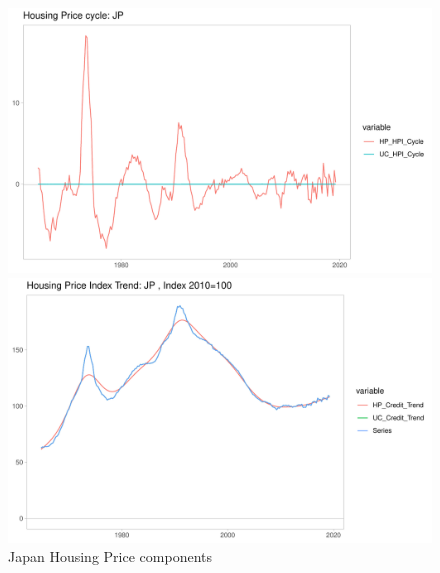 \documentclass[fleqn]{article}
\begin{document}
\begin{outline}[enumerate]
\begin{figure}[h!]
	\caption{Japan Housing Price components}	
	\centerline{\includegraphics[scale=0.7]{../Output/Graphs/HP_cycle_JP.pdf}}
	\centerline{\includegraphics[scale=0.7]{../Output/Graphs/HP_trend_JP.pdf}}
\end{figure}



\end{outline}
\end{document}
